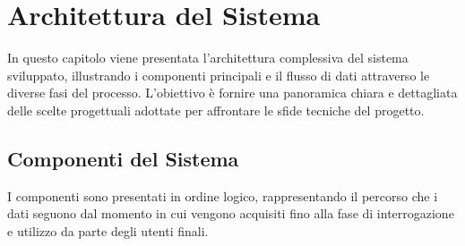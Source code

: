 \chapter{Architettura del Sistema}\label{chap:second}

\inlineminitoc

In questo capitolo viene presentata l'architettura complessiva del sistema sviluppato, illustrando i componenti principali e il flusso di dati attraverso le diverse fasi del processo. L'obiettivo è fornire una panoramica chiara e dettagliata delle scelte progettuali adottate per affrontare le sfide tecniche del progetto.

\section{Componenti del Sistema}
I componenti sono presentati in ordine logico, rappresentando il percorso che i dati seguono dal momento in cui vengono acquisiti fino alla fase di interrogazione e utilizzo da parte degli utenti finali.

